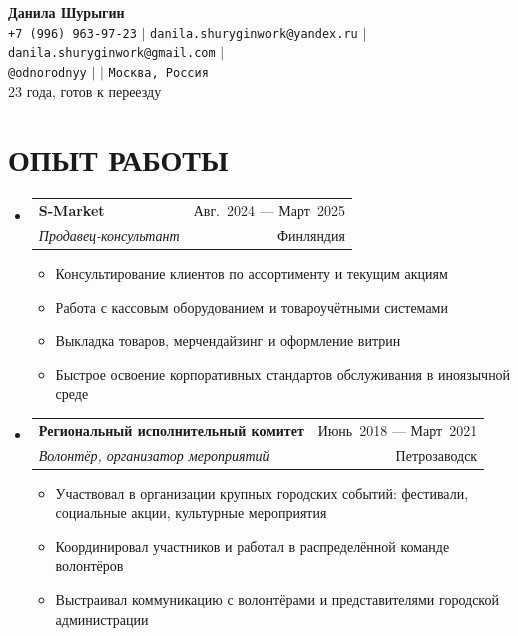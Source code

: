 \documentclass[letterpaper,11pt]{article}
\makeatletter
\newcommand{\myuline}[1]{%
  \uline{\phantom{#1}}%
  \llap{\contour{white}{#1}}%
}
\newcommand{\resumeItem}[1]{
  \item\small{
    {#1 \vspace{-1pt}}
  }
}
\newcommand{\resumeSubheading}[4]{
  \vspace{-1pt}\item
    \begin{tabular*}{\textwidth}[t]{l@{\extracolsep{\fill}}r}
      \textbf{#1} & {\color{dark-grey}\small #2}\vspace{1pt}\\
      \textit{#3} & {\color{dark-grey} \small #4}\\
    \end{tabular*}\vspace{-4pt}
}
\newcommand{\resumeSubHeadingListStart}{\begin{itemize}[leftmargin=0in, label={}]}
\newcommand{\resumeSubHeadingListEnd}{\end{itemize}}
\newcommand{\resumeItemListStart}{\begin{itemize}}
\newcommand{\resumeItemListEnd}{\end{itemize}\vspace{0pt}}
\makeatother
\begin{document}
\begin{center}
    \textbf{\Huge Данила Шурыгин} \\ \vspace{5pt}
    \small
    \faPhone* \texttt{+7 (996) 963-97-23} \hspace{1pt} $|$
    \hspace{1pt} \faEnvelope \hspace{2pt} \texttt{danila.shuryginwork@yandex.ru} \hspace{1pt} $|$
    \hspace{1pt} \faEnvelope \hspace{2pt} \texttt{danila.shuryginwork@gmail.com} \hspace{1pt} $|$ 
    \\ \vspace{3pt}
    \hspace{1pt} \faTelegram \hspace{2pt} \texttt{@odnorodnyy} \hspace{1pt} $|$
    \hspace{1pt} \faGithub \hspace{2pt} \href{https://github.com/odnorodnyy}{\myuline{odnorodnyy}} \hspace{1pt} $|$
    \hspace{1pt} \faMapMarker* \hspace{2pt}\texttt{Москва, Россия}
    \\ \vspace{5pt}
    \small 23 года, готов к переезду
\end{center}

\section{ОПЫТ РАБОТЫ}
  \resumeSubHeadingListStart
    \resumeSubheading
      {S-Market}{Авг.~2024 --- Март~2025}
      {Продавец-консультант}{Финляндия}
      \resumeItemListStart
        \resumeItem{Консультирование клиентов по ассортименту и текущим акциям}
        \resumeItem{Работа с кассовым оборудованием и товароучётными системами}
        \resumeItem{Выкладка товаров, мерчендайзинг и оформление витрин}
        \resumeItem{Быстрое освоение корпоративных стандартов обслуживания в иноязычной среде}
      \resumeItemListEnd
    \resumeSubheading
      {Региональный исполнительный комитет}{Июнь~2018 --- Март~2021}
      {Волонтёр, организатор мероприятий}{Петрозаводск}
      \resumeItemListStart
        \resumeItem{Участвовал в организации крупных городских событий: фестивали, социальные акции, культурные мероприятия}
        \resumeItem{Координировал участников и работал в распределённой команде волонтёров}
        \resumeItem{Выстраивал коммуникацию с волонтёрами и представителями городской администрации}
      \resumeItemListEnd
  \resumeSubHeadingListEnd
\end{document}
